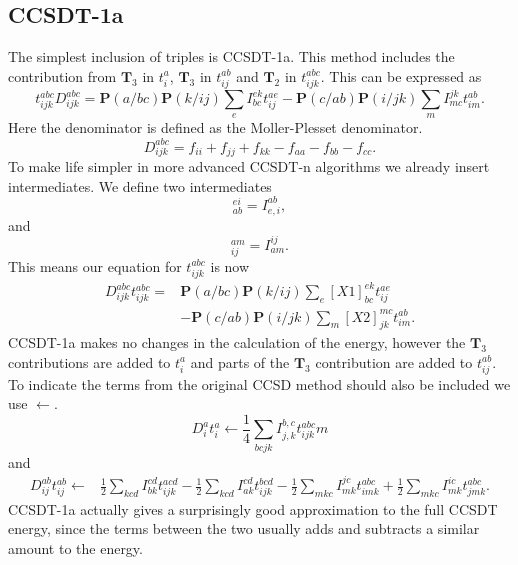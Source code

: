 \documentclass[graybox,sectrefs,envcountresetchap,open=right]{svmonodo}
\begin{document}
\subsection{CCSDT-1a}
The simplest inclusion of triples is CCSDT-1a. This method includes the contribution from $\mathbf{T}_3$ in $t_i^a$, $\mathbf{T}_3$ in $t_{ij}^{ab}$ and $\mathbf{T}_2$ in $t_{ijk}^{abc}$. This can be expressed as
\begin{equation}
t_{ijk}^{abc} D_{ijk}^{abc} = 
\mathbf{P}(a/bc) \mathbf{P}(k/ij) \sum_e I_{bc}^{ek} t_{ij}^{ae}
- \mathbf{P}(c/ab) \mathbf{P}(i/jk) \sum_m I_{mc}^{jk} t_{im}^{ab} .
\end{equation}
Here the denominator is defined as the Moller-Plesset denominator. 
\begin{equation}
D_{ijk}^{abc} = f_{ii} + f_{jj} + f_{kk} - f_{aa} - f_{bb} - f_{cc} .
\end{equation}
To make life simpler in more advanced CCSDT-n algorithms we already insert intermediates. We define two intermediates 
\begin{equation}
[X1]_{ab}^{ei} = I_{e,i}^{ab} ,
\end{equation}
and
\begin{equation}
[X2]_{ij}^{am} = I_{am}^{ij} .
\end{equation}
This means our equation for $t_{ijk}^{abc}$ is now
\begin{align}
D_{ijk}^{abc} t_{ijk}^{abc} = & \mathbf{P}(a/bc) \mathbf{P}(k/ij) \sum_e [X1]^{ek}_{bc} t_{ij}^{ae} \\ \nonumber &
- \mathbf{P}(c/ab) \mathbf{P}(i/jk) \sum_m [X2]_{jk}^{mc} t_{im}^{ab} .
\end{align}
CCSDT-1a makes no changes in the calculation of the energy, however the $\mathbf{T}_3$ contributions are added to $t_i^a$ and parts of the $\mathbf{T}_3$ contribution are added to $t_{ij}^{ab}$. To indicate the terms from the original CCSD method should also be included we use $\leftarrow$. 
\begin{equation}
D_i^a t_i^a \leftarrow \frac{1}{4} \sum_{bcjk}  I_{j,k}^{b,c} t_{ijk}^{abc} m
\end{equation}
and
\begin{align}
D_{ij}^{ab} t_{ij}^{ab} \leftarrow & 
\frac{1}{2} \sum_{kcd} I_{bk}^{cd} t_{ijk}^{acd}
- \frac{1}{2} \sum_{kcd} I_{ak}^{cd} t_{ijk}^{bcd} - \frac{1}{2} \sum_{mkc} I_{mk}^{jc} t_{imk}^{abc} + \frac{1}{2} \sum_{mkc} I_{mk}^{ic} t_{jmk}^{abc} .
\end{align}
CCSDT-1a actually gives a surprisingly good approximation to the full CCSDT energy, since the terms between the two usually adds and subtracts a similar amount to the energy. 
\end{document}
